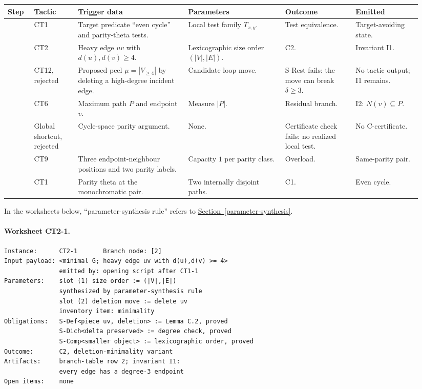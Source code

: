 \documentclass[
  11pt,
]{article}
\theoremstyle{definition}
\newcommand{\secref}[1]{\hyperref[#1]{Section~\ref*{#1}}}
\begin{document}
\begingroup
\scriptsize
\setlength{\tabcolsep}{1.8pt}
\begin{longtable}[]{@{}
  >{\raggedright\arraybackslash}p{0.06\linewidth}
  >{\raggedright\arraybackslash}p{0.10\linewidth}
  >{\raggedright\arraybackslash}p{0.25\linewidth}
  >{\raggedright\arraybackslash}p{0.22\linewidth}
  >{\raggedright\arraybackslash}p{0.16\linewidth}
  >{\raggedright\arraybackslash}p{0.15\linewidth}@{}}
\toprule\noalign{}
Step & Tactic & Trigger data & Parameters & Outcome & Emitted \\
\midrule\noalign{}
\endhead
\bottomrule\noalign{}
\endlastfoot
1 & CT1 & Target predicate ``even cycle'' and parity-theta tests. & Local test family \(T_{x,y}\). & Test equivalence. & Target-avoiding state. \\
2 & CT2 & Heavy edge \(uv\) with \(d(u),d(v)\ge4\). & Lexicographic size order \((|V|,|E|)\). & C2. & Invariant I1. \\
3 & CT12, rejected & Proposed peel \(\mu=|V_{\ge4}|\) by deleting a high-degree incident edge. & Candidate loop move. & S-Rest fails: the move can break \(\delta\ge3\). & No tactic output; I1 remains. \\
4 & CT6 & Maximum path \(P\) and endpoint \(v\). & Measure \(|P|\). & Residual branch. & I2: \(N(v)\subseteq P\). \\
5 & Global shortcut, rejected & Cycle-space parity argument. & None. & Certificate check fails: no realized local test. & No C-certificate. \\
6 & CT9 & Three endpoint-neighbour positions and two parity labels. & Capacity \(1\) per parity class. & Overload. & Same-parity pair. \\
7 & CT1 & Parity theta at the monochromatic pair. & Two internally disjoint paths. & C1. & Even cycle. \\
\end{longtable}
\endgroup

In the worksheets below, ``parameter-synthesis rule'' refers to
\secref{parameter-synthesis}.

\paragraph{Worksheet CT2-1.}
\begingroup
\small
\begin{verbatim}
Instance:      CT2-1       Branch node: [2]
Input payload: <minimal G; heavy edge uv with d(u),d(v) >= 4>
               emitted by: opening script after CT1-1
Parameters:    slot (1) size order := (|V|,|E|)
               synthesized by parameter-synthesis rule
               slot (2) deletion move := delete uv
               inventory item: minimality
Obligations:   S-Def<piece uv, deletion> := Lemma C.2, proved
               S-Dich<delta preserved> := degree check, proved
               S-Comp<smaller object> := lexicographic order, proved
Outcome:       C2, deletion-minimality variant
Artifacts:     branch-table row 2; invariant I1:
               every edge has a degree-3 endpoint
Open items:    none
\end{verbatim}
\endgroup
\end{document}
